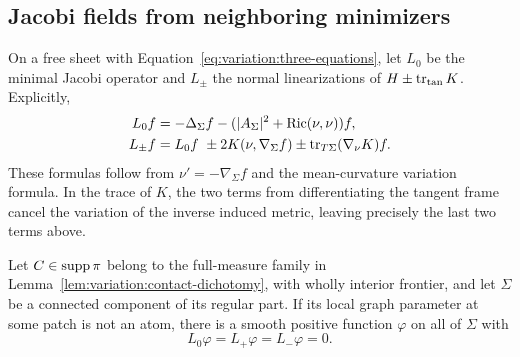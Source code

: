 \subsection{Jacobi fields from neighboring minimizers}

On a free sheet with Equation~\eqref{eq:variation:three-equations}, let $L_0$
be the minimal Jacobi operator and $L_\pm$ the normal linearizations of
$H\pm\operatorname{tr}_{\rm tan}K$.  Explicitly,
\begin{align}
 L_0f&=-\Delta_\Sigma f-(|A_\Sigma|^2+\operatorname{Ric}(\nu,\nu))f,
 \label{eq:variation:L0}\\
 L_\pm f&=L_0f\ \pm2K(\nu,\nabla_\Sigma f)
                      \pm\operatorname{tr}_{T\Sigma}(\nabla_\nu K)f.
 \label{eq:variation:Lpm}
\end{align}
These formulas follow from $\nu'=-\nabla_\Sigma f$ and the
mean-curvature variation formula.  In the trace of $K$, the two terms
from differentiating the tangent frame cancel the variation of the
inverse induced metric, leaving precisely the last two terms above.

\begin{lemma}
\label{lem:variation:common-jacobi}
Let $C\in\operatorname{supp}\pi$ belong to the full-measure family in
Lemma~\ref{lem:variation:contact-dichotomy}, with wholly interior
frontier, and let $\Sigma$ be a connected component of its regular
part.  If its local graph parameter at some patch is not an atom,
there is a smooth positive function $\varphi$ on all of $\Sigma$ with
\begin{equation}\label{eq:variation:common-jacobi}
 L_0\varphi=L_+\varphi=L_-\varphi=0.
\end{equation}
\end{lemma}

